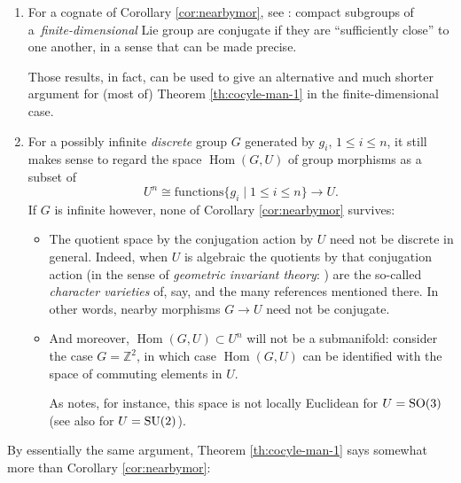\documentclass[10pt,a4paper]{amsart}
\numberwithin{equation}{section}
\newcommand\bZ{{\mathbb Z}}
\DeclareMathOperator{\Hom}{\mathrm{Hom}}
\begin{document}
\begin{Remarks}\label{res:mz}\quad
 \begin{enumerate}[(1)]\itemsep=0pt

 \item\label{item:remz} For a cognate of Corollary \ref{cor:nearbymor}, see \cite[Theorem 1 and Corollary]{mz-conj}: compact subgroups of a~{\it finite-dimensional} Lie group are conjugate if they are ``sufficiently close'' to one another, in a sense that can be made precise.

 Those results, in fact, can be used to give an alternative and much shorter argument for (most of) Theorem \ref{th:cocyle-man-1} in the finite-dimensional case.

 \item For a possibly infinite {\it discrete} group $G$ generated by $g_i$, $1\le i\le n$, it still makes sense to regard the space $\Hom(G,U)$ of group morphisms as a subset of
 \begin{equation*}
 U^n\cong \mathrm{functions} \{g_i\mid 1\le i\le n\}\to U.
 \end{equation*}
 If $G$ is infinite however, none of Corollary \ref{cor:nearbymor} survives:
 \begin{itemize}\itemsep=0pt
 \item The quotient space by the conjugation action by $U$ need not be discrete in general. Indeed, when $U$ is algebraic the quotients by that conjugation action (in the sense of {\it geometric invariant theory}: \cite[Chapter 1, Section~4]{fkm}) are the so-called {\it character varieties} of, say, \cite[Introduction]{ls} and the many references mentioned there. In other words, nearby morphisms $G\to U$ need not be conjugate.
 \item And moreover, $\Hom(G,U)\subset U^n$ will not be a submanifold: consider the case $G=\bZ^2$, in which case $\Hom(G,U)$ can be identified with the space of commuting elements in $U$.

 As \cite[paragraph following the proof of Theorem 3.1]{gs} notes, for instance, this space is not locally Euclidean for $U={\rm SO}(3)$ (see also \cite[p.~739]{baird} for $U={\rm SU}(2)$).
 \end{itemize}
 \end{enumerate}
\end{Remarks}

By essentially the same argument, Theorem \ref{th:cocyle-man-1} says somewhat more than Corollary \ref{cor:nearbymor}:
\end{document}
